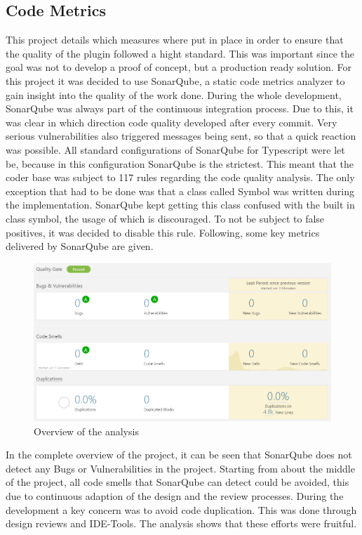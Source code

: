 \subsection{Code Metrics}
This project details which measures where put in place in order to ensure that the quality of the plugin followed a hight standard. This was important since the goal was not to develop a proof of concept, but a production ready solution. For this project it was decided to use SonarQube, a static code metrics analyzer to gain insight into the quality of the work done.\newline
During the whole development, SonarQube was always part of the continuous integration process. Due to this, it was clear in which direction code quality developed after every commit. Very serious vulnerabilities also triggered messages being sent, so that a quick reaction was possible. \newline
All standard configurations of SonarQube for Typescript were let be, because in this configuration SonarQube is the strictest. This meant that the coder base was subject to 117 rules regarding the code quality analysis. The only exception that had to be done was that a class called Symbol was written during the implementation. SonarQube kept getting this class confused with the built in class symbol, the usage of which is discouraged. To not be subject to false positives, it was decided to disable this rule.\newline
Following, some key metrics delivered by SonarQube are given.\newline
\begin{figure}[H]
	\centering
	\includegraphics[width=1\textwidth]{img/sonarAll}
	\caption{Overview of the analysis}
	\label{fig:sonarQubeOverview}
\end{figure}
In the complete overview of the project, it can be seen that SonarQube does not detect any Bugs or Vulnerabilities in the project. Starting from about the middle of the project, all code smells that SonarQube can detect could be avoided, this due to continuous adaption of the design and the review processes. During the development a key concern was to avoid code duplication. This was done through design reviews and IDE-Tools. The analysis shows that these efforts were fruitful.\newline
